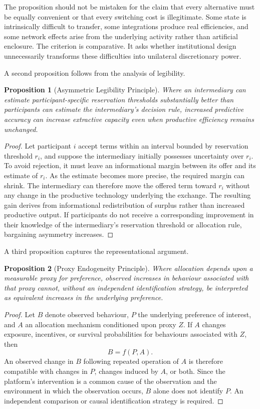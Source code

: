 \documentclass[11pt]{article}
\newtheorem{proposition}{Proposition}
\begin{document}
The proposition should not be mistaken for the claim that every alternative must be equally convenient or that every switching cost is illegitimate. Some state is intrinsically difficult to transfer, some integrations produce real efficiencies, and some network effects arise from the underlying activity rather than artificial enclosure. The criterion is comparative. It asks whether institutional design unnecessarily transforms these difficulties into unilateral discretionary power.

A second proposition follows from the analysis of legibility.

\begin{proposition}[Asymmetric Legibility Principle]
Where an intermediary can estimate participant-specific reservation thresholds substantially better than participants can estimate the intermediary's decision rule, increased predictive accuracy can increase extractive capacity even when productive efficiency remains unchanged.
\end{proposition}

\begin{proof}
Let participant \(i\) accept terms within an interval bounded by reservation threshold \(r_i\), and suppose the intermediary initially possesses uncertainty over \(r_i\). To avoid rejection, it must leave an informational margin between its offer and its estimate of \(r_i\). As the estimate becomes more precise, the required margin can shrink. The intermediary can therefore move the offered term toward \(r_i\) without any change in the productive technology underlying the exchange. The resulting gain derives from informational redistribution of surplus rather than increased productive output. If participants do not receive a corresponding improvement in their knowledge of the intermediary's reservation threshold or allocation rule, bargaining asymmetry increases.
\end{proof}

A third proposition captures the representational argument.

\begin{proposition}[Proxy Endogeneity Principle]
Where allocation depends upon a measurable proxy for preference, observed increases in behaviour associated with that proxy cannot, without an independent identification strategy, be interpreted as equivalent increases in the underlying preference.
\end{proposition}

\begin{proof}
Let \(B\) denote observed behaviour, \(P\) the underlying preference of interest, and \(A\) an allocation mechanism conditioned upon proxy \(Z\). If \(A\) changes exposure, incentives, or survival probabilities for behaviours associated with \(Z\), then
\[
B=f(P,A).
\]
An observed change in \(B\) following repeated operation of \(A\) is therefore compatible with changes in \(P\), changes induced by \(A\), or both. Since the platform's intervention is a common cause of the observation and the environment in which the observation occurs, \(B\) alone does not identify \(P\). An independent comparison or causal identification strategy is required.
\end{proof}
\end{document}
